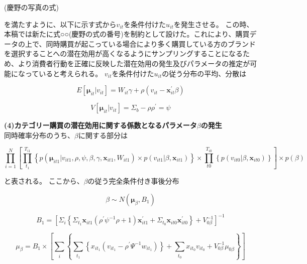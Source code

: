 \documentclass[11pt]{jsarticle}
\begin{document}
(慶野の写真の式)

を満たすように、以下に示す式から$v_{it}$を条件付けた$u_{it}$を発生させる。
この時、本稿では新たに式○○(慶野の式の番号)を制約として設けた。これにより、購買データの上で、同時購買が起こっている場合により多く購買している方のブランドを選択することへの潜在効用が高くなるようにサンプリングすることになるため、より消費者行動を正確に反映した潜在効用の発生及びパラメータの推定が可能になっていると考えられる。
$v_{it}$を条件付けた$u_{it}$の従う分布の平均、分散は

\begin{equation}\label{formula35}
E[{\boldsymbol\mu}_{it}|v_{it}]=W_{it}\gamma+\rho(v_{it}-\textbf{x}_{it}^{'}\beta)
\end{equation}

\begin{equation}\label{formula36}
V[{\boldsymbol\mu}_{it}|v_{it}]=\Sigma_{b}-\rho\rho^{'}=\psi
\end{equation}

{\bf (4)カテゴリー購買の潜在効用に関する係数となるパラメータ$\beta$の発生}\\
同時確率分布のうち、$\beta$に関する部分は

\begin{equation}\label{formula41}
\prod_{i=1}^{N}\left[
 \prod_{t_{1}}^{T_{i1}}\left\{
  p({\boldsymbol\mu}_{it1}|v_{it1},\rho,\psi,\beta,\gamma,\textbf{x}_{it1},W_{it1})
  ×p(v_{it1}|\beta,\textbf{x}_{it1})
 \right\}
 ×\prod_{t0}^{T_{i0}}\left\{
  p(v_{it0}|\beta,\textbf{x}_{it0})
 \right\}
\right]
×p(\beta)
\end{equation}

と表される。
ここから、$\beta$の従う完全条件付き事後分布

\begin{equation}\label{formula42}
\beta \sim N({\boldsymbol\mu}_{\beta},B_{1})
\end{equation}

\begin{equation}\label{formula43}
B_{1} = \left[
 \Sigma_{i}\left\{
  \Sigma_{t_{1}}\textbf{x}_{it1}(\rho^{'}\psi^{-1}\rho+1)\textbf{x}_{it1}^{'}
  +\Sigma_{t_{0}}\textbf{x}_{it0}\textbf{x}_{it0}^{'}
 \right\}
 +V_{0\beta}^{-1}
\right]^{-1}
\end{equation}

\begin{equation} \label{formula44}
\mu_{\beta} = B_{1} \times
\left[
\sum_{\substack{i}}
\left\{
\sum_{\substack{t_{1}}}
\left\{
x_{it_{1}} (v_{it_{1}} - \rho^{\prime} \Psi^{-1} w_{it_{1}})
\right\} + \sum_{\substack{t_{0}}} x_{it_{0}} v_{it_{0}} + V^{-1}_{0\beta} \mu_{0\beta}
\right\}
\right]
\end{equation}
\end{document}
